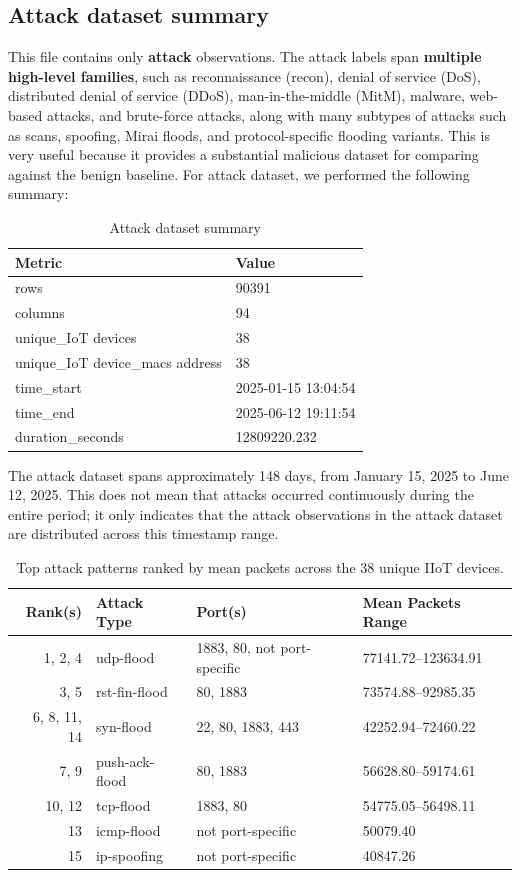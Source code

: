 \documentclass[final,5p,times,twocolumn]{elsarticle}
\begin{document}
\subsection{Attack dataset summary}
This file contains only \textbf{attack} observations. The attack labels span \textbf{multiple high-level families}, such as reconnaissance (recon), denial of service (DoS), distributed denial of service (DDoS), man-in-the-middle (MitM), malware, web-based attacks, and brute-force attacks, along with many subtypes of attacks such as scans, spoofing, Mirai floods, and protocol-specific flooding variants. This is very useful because it provides a substantial malicious dataset for comparing against the benign baseline.
For attack dataset, we performed the following summary:
\begin{table}[H]
\caption{Attack dataset summary}
\centering
\begin{tabular}{ll}
\hline
\textbf{Metric} & \textbf{Value} \\ \hline
rows & 90391 \\
columns & 94 \\
unique\_IoT devices & 38 \\
unique\_IoT device\_macs address & 38 \\
time\_start & 2025-01-15 13:04:54 \\
time\_end & 2025-06-12 19:11:54 \\
duration\_seconds & 12809220.232 \\ \hline
\end{tabular}
\label{tab:dataset_summary_attack}
\end{table}
The attack dataset spans approximately 148 days, from January 15, 2025 to June 12, 2025. This does not mean that attacks occurred continuously during the entire period; it only indicates that the attack observations in the attack dataset are distributed across this timestamp range.

\begin{table}[H]
\caption{Top attack patterns ranked by mean packets across the 38 unique IIoT devices.}
\centering
\scriptsize
\setlength{\tabcolsep}{3pt}
\begin{tabular}{rlll}
\hline
\textbf{Rank(s)} & \textbf{Attack Type} & \textbf{Port(s)} & \textbf{Mean Packets Range} \\ \hline
1, 2, 4 & udp-flood & 1883, 80, not port-specific & 77141.72--123634.91 \\
3, 5 & rst-fin-flood & 80, 1883 & 73574.88--92985.35 \\
6, 8, 11, 14 & syn-flood & 22, 80, 1883, 443 & 42252.94--72460.22 \\
7, 9 & push-ack-flood & 80, 1883 & 56628.80--59174.61 \\
10, 12 & tcp-flood & 1883, 80 & 54775.05--56498.11 \\
13 & icmp-flood & not port-specific & 50079.40 \\
15 & ip-spoofing & not port-specific & 40847.26 \\ \hline
\end{tabular}
\label{tab:top_attack_patterns_ports}
\end{table}
\end{document}
